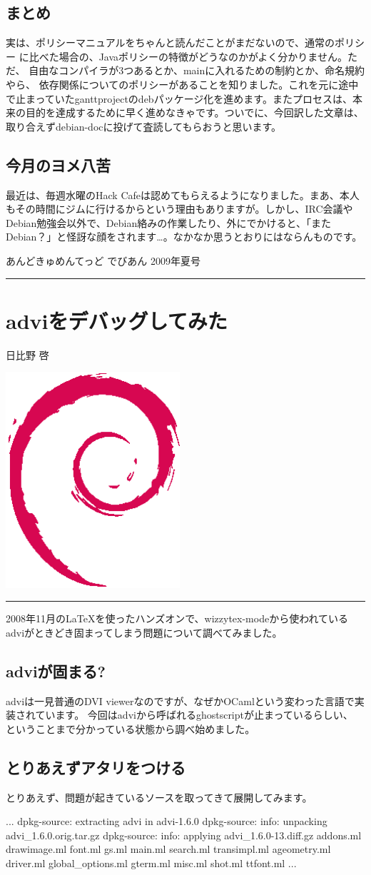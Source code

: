 \documentclass[mingoth,a4paper]{jsarticle}
\renewcommand{\dancersection}[2]{%
\newpage
あんどきゅめんてっど でびあん 2009年夏号
%
\vspace{0.1mm}\\
{\color{dancerlightblue}\rule{\hsize}{2mm}}

%
%
\begin{minipage}[t]{0.6\hsize}
\color{dancerdarkblue}
\vspace{1cm}
\section{#1}
\hfill{}#2\\
\end{minipage}
\begin{minipage}[t]{0.4\hsize}
\vspace{-2cm}
\hfill{}\includegraphics[height=8cm]{image200502/openlogo-nd.eps}\\
\vspace{-5cm}
\end{minipage}
%
%
{\color{dancerdarkblue}\rule{0.74\hsize}{2mm}}
%
\vspace{2cm}
}
\begin{document}
\subsection{まとめ}
実は、ポリシーマニュアルをちゃんと読んだことがまだないので、通常のポリシー
に比べた場合の、Javaポリシーの特徴がどうなのかがよく分かりません。ただ、
自由なコンパイラが3つあるとか、mainに入れるための制約とか、命名規約やら、
依存関係についてのポリシーがあることを知りました。これを元に途中で止まっていたganttprojectのdebパッケージ化を進めます。またプロセスは、本来の目的を達成するために早く進めなきゃです。ついでに、今回訳した文章は、取り合えずdebian-docに投げて査読してもらおうと思います。


\subsection{今月のヨメ八苦}
最近は、毎週水曜のHack Cafeは認めてもらえるようになりました。まあ、本人もその時間にジムに行けるからという理由もありますが。しかし、IRC会議やDebian勉強会以外で、Debian絡みの作業したり、外にでかけると、「またDebian？」と怪訝な顔をされます…。なかなか思うとおりにはならんものです。

\dancersection{adviをデバッグしてみた}{日比野 啓}

2008年11月のLaTeXを使ったハンズオンで、wizzytex-modeから使われている
adviがときどき固まってしまう問題について調べてみました。

\subsection{adviが固まる?}

adviは一見普通のDVI viewerなのですが、なぜかOCamlという変わった言語で実装されています。
今回はadviから呼ばれるghostscriptが止まっているらしい、
ということまで分かっている状態から調べ始めました。

\subsection{とりあえずアタリをつける}

とりあえず、問題が起きているソースを取ってきて展開してみます。

\begin{commandline}
...
dpkg-source: extracting advi in advi-1.6.0
dpkg-source: info: unpacking advi_1.6.0.orig.tar.gz
dpkg-source: info: applying advi_1.6.0-13.diff.gz
addons.ml     drawimage.ml  font.ml            gs.ml             main.ml     search.ml      transimpl.ml
ageometry.ml  driver.ml     global_options.ml  gterm.ml          misc.ml     shot.ml        ttfont.ml
...
\end{commandline}
\end{document}
